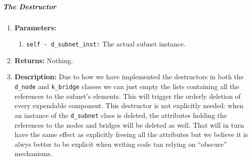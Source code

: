         \subparagraph{The Destructor}
            \begin{enumerate}
                \item \textbf{Parameters:}
                \begin{enumerate}
                    \item \texttt{self - d\_subnet\_inst:} The actual subnet instance.
                \end{enumerate}
                \item \textbf{Returns:} Nothing.
                \item \textbf{Description:} Due to how we have implemented the destructors in both the \texttt{d\_node} and \texttt{k\_bridge} classes we can just empty the lists containing all the references to the subnet's elements. This will trigger the orderly deletion of every expendable component. This destructor is not explicitly needed: when an instance of the \texttt{d\_subnet} class is deleted, the attributes holding the references to the nodes and bridges will be deleted as well. That will in turn have the same effect as explicitly freeing all the attributes but we believe it is alwys better to be explicit when writing code tan relying on ``obscure'' mechanisms.
            \end{enumerate}
